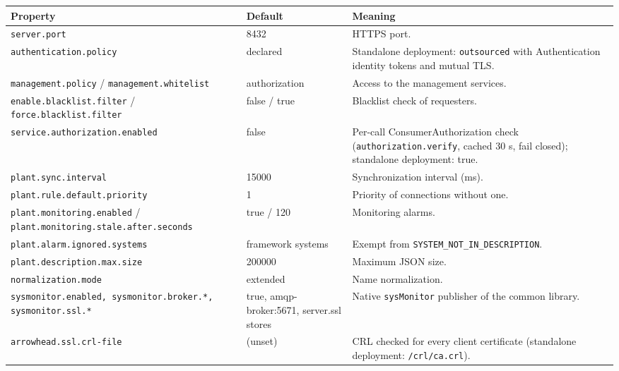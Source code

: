 \documentclass[a4paper]{arrowhead}
\begin{document}
\noindent\begin{longtable}{| p{5.4cm} | p{3.4cm} | p{6.4cm} |} \hline
\rowcolor{gray!33} Property & Default & Meaning \\ \hline \endhead
\texttt{server.\allowbreak{}port} & 8432 & HTTPS port. \\ \hline
\texttt{authentication.\allowbreak{}policy} & declared & Standalone deployment: \texttt{outsourced} with Authentication identity tokens and mutual TLS. \\ \hline
\texttt{management.\allowbreak{}policy} / \texttt{management.\allowbreak{}whitelist} & authorization & Access to the management services. \\ \hline
\texttt{enable.\allowbreak{}blacklist.\allowbreak{}filter} / \texttt{force.\allowbreak{}blacklist.\allowbreak{}filter} & false / true & Blacklist check of requesters. \\ \hline
\texttt{service.\allowbreak{}authorization.\allowbreak{}enabled} & false & Per-call Consumer\allowbreak{}Authorization check (\texttt{authorization.\allowbreak{}verify}, cached 30 s, fail closed); standalone deployment: true. \\ \hline
\texttt{plant.\allowbreak{}sync.\allowbreak{}interval} & 15000 & Synchronization interval (ms). \\ \hline
\texttt{plant.\allowbreak{}rule.\allowbreak{}default.\allowbreak{}priority} & 1 & Priority of connections without one. \\ \hline
\texttt{plant.\allowbreak{}monitoring.\allowbreak{}enabled} / \texttt{plant.\allowbreak{}monitoring.\allowbreak{}stale.\allowbreak{}after.\allowbreak{}seconds} & true / 120 & Monitoring alarms. \\ \hline
\texttt{plant.\allowbreak{}alarm.\allowbreak{}ignored.\allowbreak{}systems} & framework systems & Exempt from \texttt{SYSTEM\_\allowbreak{}NOT\_\allowbreak{}IN\_\allowbreak{}DESCRIPTION}. \\ \hline
\texttt{plant.\allowbreak{}description.\allowbreak{}max.\allowbreak{}size} & 200000 & Maximum JSON size. \\ \hline
\texttt{normalization.\allowbreak{}mode} & extended & Name normalization. \\ \hline
\texttt{sysmonitor.\allowbreak{}enabled,\allowbreak{} sysmonitor.\allowbreak{}broker.\allowbreak{}*,\allowbreak{} sysmonitor.\allowbreak{}ssl.\allowbreak{}*} & true, amqp-broker:5671, server.ssl stores & Native \texttt{sysMonitor} publisher of the common library. \\ \hline
\texttt{arrowhead.\allowbreak{}ssl.\allowbreak{}crl-\allowbreak{}file} & (unset) & CRL checked for every client certificate (standalone deployment: \texttt{/\allowbreak{}crl/\allowbreak{}ca.\allowbreak{}crl}). \\ \hline
\end{longtable}
\end{document}
